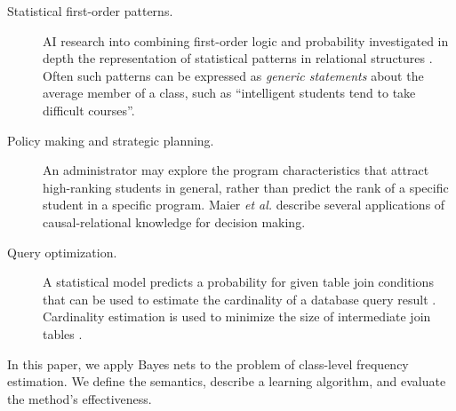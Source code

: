 \documentclass[oribibl]{llncs}
\begin{document}
\begin{description}
\item [Statistical first-order patterns.] AI research into combining first-order logic and probability investigated in depth the representation of statistical patterns in relational structures \cite{Halpern90,Bacchus90}. Often such patterns can be expressed as {\em generic statements} about the average member of a class, such as ``intelligent students tend to take difficult courses''. 

\item [ Policy making and strategic planning.] An administrator may explore the program characteristics that attract high-ranking students in general, rather than predict the rank of a specific student in a specific program. Maier {\em et al.} \cite{Maier2010} describe several applications of causal-relational knowledge for decision making. 

\item [ Query optimization.] A statistical model predicts a probability for given table join conditions that can be used to estimate the cardinality of a database query result \cite{Getoor2001}. Cardinality estimation is used to minimize the size of intermediate join tables \cite{Babcock2005}. 
\end{description}

In this paper, we apply Bayes nets to the problem of class-level frequency estimation. We define the semantics, describe a learning algorithm, and evaluate the method's effectiveness.
\end{document}
